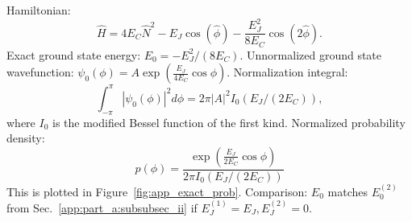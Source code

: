 \documentclass[12pt]{article}
\begin{document}
\begin{appendices}
Hamiltonian: \[\hat{H} = 4E_C \hat{N}^2 - E_J \cos(\hat{\phi}) - \frac{E_J^2}{8E_C} \cos(2\hat{\phi}).\]
Exact ground state energy: $E_0 = -E_J^2 / (8 E_C).$
Unnormalized ground state wavefunction: $\psi_0(\phi) = A \exp(\frac{E_J}{4 E_C} \cos \phi)$.
Normalization integral: \[\int_{-\pi}^{\pi} |\psi_0(\phi)|^2 d\phi = 2\pi |A|^2 I_0(E_J / (2 E_C)),\] where $I_0$ is the modified Bessel function of the first kind.
Normalized probability density:
\[ p(\phi) = \frac{\exp(\frac{E_J}{2 E_C} \cos \phi)}{2 \pi I_0(E_J / (2 E_C))} \]
This is plotted in Figure~\ref{fig:app_exact_prob}.
Comparison: $E_0$ matches $E_0^{(2)}$ from Sec.~\ref{app:part_a:subsubsec_ii} if $E_J^{(1)}=E_J, E_J^{(2)}=0$.



\end{appendices}
\end{document}
